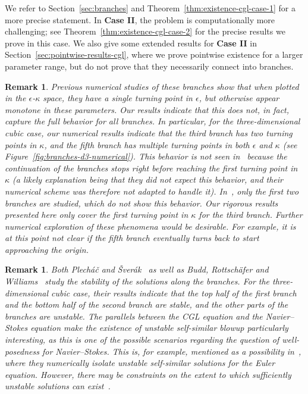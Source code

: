 \documentclass[11pt]{article}
\newtheorem{remark}[definition]{Remark}
\begin{document}
We refer to Section~\ref{sec:branches} and
Theorem~\ref{thm:existence-cgl-case-1} for a more precise statement.
In \textbf{Case II}, the problem is computationally more challenging;
see Theorem~\ref{thm:existence-cgl-case-2} for the precise results we
prove in this case. We also give some extended results for
\textbf{Case II} in Section~\ref{sec:pointwise-results-cgl}, where we
prove pointwise existence for a larger parameter range, but do not
prove that they necessarily connect into branches.

\begin{remark}
  Previous numerical studies of these branches show that when plotted
  in the \(\epsilon\)-\(\kappa\) space, they have a single turning
  point in \(\epsilon\), but otherwise appear monotone in these
  parameters. Our results indicate that this does not, in fact,
  capture the full behavior for all branches. In particular, for the
  three-dimensional cubic case, our numerical results indicate that
  the third branch has two turning points in \(\kappa\), and the fifth
  branch has multiple turning points in both \(\epsilon\) and
  \(\kappa\) (see Figure~\ref{fig:branches-d3-numerical}). This
  behavior is not seen in~\cite{Plech2001} because the continuation of
  the branches stops right before reaching the first turning point in
  \(\kappa\) (a likely explanation being that they did not expect this
  behavior, and their numerical scheme was therefore not adapted to
  handle it). In~\cite{Budd2005}, only the first two branches are
  studied, which do not show this behavior. Our rigorous results
  presented here only cover the first turning point in \(\kappa\) for
  the third branch. Further numerical exploration of these phenomena
  would be desirable. For example, it is at this point not clear if
  the fifth branch eventually turns back to start approaching the
  origin.
\end{remark}

\begin{remark}
  Both Plecháč and Šverák~\cite{Plech2001} as well as Budd,
  Rottschäfer and Williams~\cite{Budd2005} study the stability of the
  solutions along the branches. For the three-dimensional cubic case,
  their results indicate that the top half of the first branch and the
  bottom half of the second branch are stable, and the other parts of
  the branches are unstable. The parallels between the CGL equation
  and the Navier--Stokes equation make the existence of unstable
  self-similar blowup particularly interesting, as this is one of the
  possible scenarios regarding the question of well-posedness for
  Navier--Stokes. This is, for example, mentioned as a possibility
  in~\cite{Wang2025}, where they numerically isolate unstable
  self-similar solutions for the Euler equation. However, there may be
  constraints on the extent to which sufficiently unstable solutions
  can exist~\cite{Constantin2026}.
\end{remark}
\end{document}
